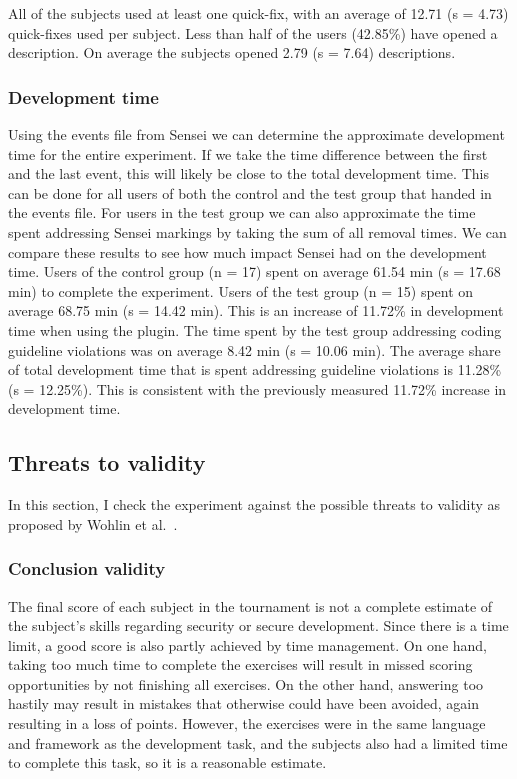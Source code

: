All of the subjects used at least one quick-fix, with an average of 12.71 (s = 4.73) quick-fixes used per subject.
Less than half of the users (42.85\%) have opened a description.
On average the subjects opened 2.79 (s = 7.64) descriptions.

\subsubsection{Development time}
Using the events file from Sensei we can determine the approximate development time for the entire experiment.
If we take the time difference between the first and the last event, this will likely be close to the total development time.
This can be done for all users of both the control and the test group that handed in the events file.
For users in the test group we can also approximate the time spent addressing Sensei markings by taking the sum of all removal times.
We can compare these results to see how much impact Sensei had on the development time.
Users of the control group (n = 17) spent on average 61.54 min (s = 17.68 min) to complete the experiment.
Users of the test group (n = 15) spent on average 68.75 min (s = 14.42 min).
This is an increase of 11.72\% in development time when using the plugin.
The time spent by the test group addressing coding guideline violations was on average 8.42 min (s = 10.06 min).
The average share of total development time that is spent addressing guideline violations is 11.28\% (s = 12.25\%).
This is consistent with the previously measured 11.72\% increase in development time.

\subsection{Threats to validity}
In this section, I check the experiment against the possible threats to validity as proposed by Wohlin et al.~\cite{wohlin2012experimentation}. 

\subsubsection{Conclusion validity}%
The final score of each subject in the tournament is not a complete estimate of the subject's skills regarding security or secure development.
Since there is a time limit, a good score is also partly achieved by time management.
On one hand, taking too much time to complete the exercises will result in missed scoring opportunities by not finishing all exercises.
On the other hand, answering too hastily may result in mistakes that otherwise could have been avoided, again resulting in a loss of points.
However, the exercises were in the same language and framework as the development task, and the subjects also had a limited time to complete this task, so it is a reasonable estimate.
 
